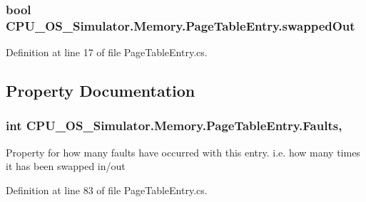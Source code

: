\subsubsection[{swapped\+Out}]{\setlength{\rightskip}{0pt plus 5cm}bool C\+P\+U\+\_\+\+O\+S\+\_\+\+Simulator.\+Memory.\+Page\+Table\+Entry.\+swapped\+Out\hspace{0.3cm}{\ttfamily [private]}}\label{class_c_p_u___o_s___simulator_1_1_memory_1_1_page_table_entry_ab31d6265aff999ff7a94481f1efc45b5}


Definition at line 17 of file Page\+Table\+Entry.\+cs.



\subsection{Property Documentation}
\hypertarget{class_c_p_u___o_s___simulator_1_1_memory_1_1_page_table_entry_a2a8e194e6452298fe5b0a0c6405bf57b}{}
\subsubsection[{Faults}]{\setlength{\rightskip}{0pt plus 5cm}int C\+P\+U\+\_\+\+O\+S\+\_\+\+Simulator.\+Memory.\+Page\+Table\+Entry.\+Faults\hspace{0.3cm}{\ttfamily [get]}, {\ttfamily [set]}}\label{class_c_p_u___o_s___simulator_1_1_memory_1_1_page_table_entry_a2a8e194e6452298fe5b0a0c6405bf57b}


Property for how many faults have occurred with this entry. i.\+e. how many times it has been swapped in/out 



Definition at line 83 of file Page\+Table\+Entry.\+cs.

\hypertarget{class_c_p_u___o_s___simulator_1_1_memory_1_1_page_table_entry_a4c1fb37bb101546867d77a4f781ba51d}{}
